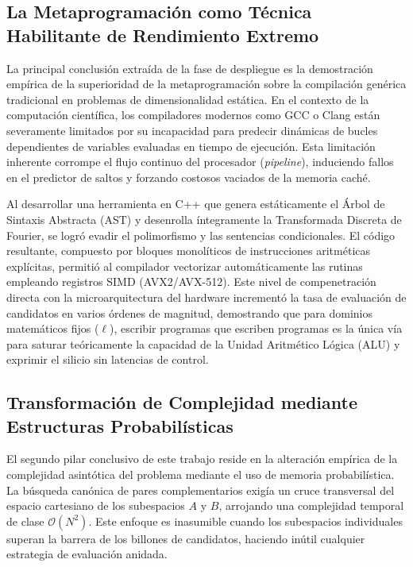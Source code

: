 \documentclass[12pt,a4paper]{tfg_domingo}
\begin{document}
\subsection{La Metaprogramación como Técnica Habilitante de Rendimiento Extremo}

La principal conclusión extraída de la fase de despliegue es la demostración empírica de la superioridad de la metaprogramación sobre la compilación genérica tradicional en problemas de dimensionalidad estática. En el contexto de la computación científica, los compiladores modernos como GCC o Clang están severamente limitados por su incapacidad para predecir dinámicas de bucles dependientes de variables evaluadas en tiempo de ejecución. Esta limitación inherente corrompe el flujo continuo del procesador (\emph{pipeline}), induciendo fallos en el predictor de saltos y forzando costosos vaciados de la memoria caché.

Al desarrollar una herramienta en C++ que genera estáticamente el Árbol de Sintaxis Abstracta (AST) y desenrolla íntegramente la Transformada Discreta de Fourier, se logró evadir el polimorfismo y las sentencias condicionales. El código resultante, compuesto por bloques monolíticos de instrucciones aritméticas explícitas, permitió al compilador vectorizar automáticamente las rutinas empleando registros SIMD (AVX2/AVX-512). Este nivel de compenetración directa con la microarquitectura del hardware incrementó la tasa de evaluación de candidatos en varios órdenes de magnitud, demostrando que para dominios matemáticos fijos ($\ell$), escribir programas que escriben programas es la única vía para saturar teóricamente la capacidad de la Unidad Aritmético Lógica (ALU) y exprimir el silicio sin latencias de control.

\subsection{Transformación de Complejidad mediante Estructuras Probabilísticas}

El segundo pilar conclusivo de este trabajo reside en la alteración empírica de la complejidad asintótica del problema mediante el uso de memoria probabilística. La búsqueda canónica de pares complementarios exigía un cruce transversal del espacio cartesiano de los subespacios $A$ y $B$, arrojando una complejidad temporal de clase $\mathcal{O}(N^2)$. Este enfoque es inasumible cuando los subespacios individuales superan la barrera de los billones de candidatos, haciendo inútil cualquier estrategia de evaluación anidada.
\end{document}
